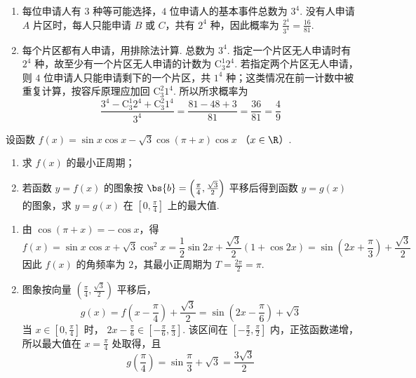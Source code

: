 \begin{solution}
\begin{enumerate}
\item 每位申请人有 \(3\) 种等可能选择，\(4\) 位申请人的基本事件总数为 \(3^{4}\). 没有人申请 \(A\) 片区时，每人只能申请 \(B\) 或 \(C\)，共有 \(2^{4}\) 种，因此概率为
\(\frac{2^{4}}{3^{4}}=\frac{16}{81}\).
\item 每个片区都有人申请，用排除法计算. 总数为 \(3^{4}\). 指定一个片区无人申请时有 \(2^{4}\) 种，故至少有一个片区无人申请的计数为
\(\mathrm C_{3}^{1}2^{4}\). 若指定两个片区无人申请，则 \(4\) 位申请人只能申请剩下的一个片区，共 \(1^{4}\) 种；这类情况在前一计数中被重复计算，按容斥原理应加回 \(\mathrm C_{3}^{2}1^{4}\). 所以所求概率为
\[
\frac{3^{4}-\mathrm C_{3}^{1}2^{4}+\mathrm C_{3}^{2}1^{4}}{3^{4}}
=\frac{81-48+3}{81}
=\frac{36}{81}
=\frac49
\]
\end{enumerate}
\end{solution}

\begin{problem}
设函数 \(f(x) = \sin x \cos x - \sqrt{3}\cos\left(\pi + x\right)\cos x\) （\(x \in \R\)）.
\begin{enumerate}
\item 求 \(f(x)\) 的最小正周期；
\item 若函数 \(y = f(x)\) 的图象按 \(\bs{b} = \left(\frac{\pi}{4}, \frac{\sqrt{3}}{2}\right)\) 平移后得到函数 \(y = g(x)\) 的图象，求 \(y = g(x)\) 在 \(\left[0, \frac{\pi}{4}\right]\) 上的最大值.
\end{enumerate}
\end{problem}

\begin{solution}
\begin{enumerate}
\item 由 \(\cos(\pi+x)=-\cos x\)，得
\[
f(x)=\sin x\cos x+\sqrt3\cos^{2}x
=\frac12\sin2x+\frac{\sqrt3}{2}(1+\cos2x)
=\sin\left(2x+\frac{\pi}{3}\right)+\frac{\sqrt3}{2}
\]
因此 \(f(x)\) 的角频率为 \(2\)，其最小正周期为
\(T=\frac{2\pi}{2}=\pi\).
\item 图象按向量 \(\left(\frac{\pi}{4},\frac{\sqrt3}{2}\right)\) 平移后，
\[
g(x)=f\left(x-\frac{\pi}{4}\right)+\frac{\sqrt3}{2}
=\sin\left(2x-\frac{\pi}{6}\right)+\sqrt3
\]
当 \(x\in\left[0,\frac{\pi}{4}\right]\) 时，
\(2x-\frac{\pi}{6}\in\left[-\frac{\pi}{6},\frac{\pi}{3}\right]\). 该区间在 \([-\frac{\pi}{2},\frac{\pi}{2}]\) 内，正弦函数递增，所以最大值在 \(x=\frac{\pi}{4}\) 处取得，且
\[
g\left(\frac{\pi}{4}\right)=\sin\frac{\pi}{3}+\sqrt3=\frac{3\sqrt3}{2}
\]
\end{enumerate}
\end{solution}

